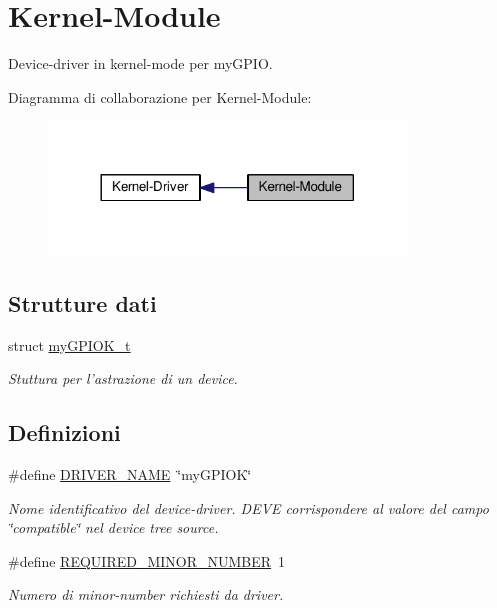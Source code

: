 \hypertarget{group___kernel-_module}{\section{Kernel-\/\+Module}
\label{group___kernel-_module}
}


Device-\/driver in kernel-\/mode per my\+G\+P\+I\+O.  


Diagramma di collaborazione per Kernel-\/\+Module\+:\nopagebreak
\begin{figure}[H]
\begin{center}
\leavevmode
\includegraphics[width=269pt]{group___kernel-_module}
\end{center}
\end{figure}
\subsection*{Strutture dati}
\begin{DoxyCompactItemize}
\item 
struct \hyperlink{structmy_g_p_i_o_k__t}{my\+G\+P\+I\+O\+K\+\_\+t}
\begin{DoxyCompactList}\small\item\em Stuttura per l'astrazione di un device. \end{DoxyCompactList}\end{DoxyCompactItemize}
\subsection*{Definizioni}
\begin{DoxyCompactItemize}
\item 
\#define \hyperlink{group___kernel-_module_ga25634d21648ca7fb7a2aca614bafaaeb}{D\+R\+I\+V\+E\+R\+\_\+\+N\+A\+M\+E}~\char`\"{}my\+G\+P\+I\+O\+K\char`\"{}
\begin{DoxyCompactList}\small\item\em Nome identificativo del device-\/driver. D\+E\+V\+E corrispondere al valore del campo \char`\"{}compatible\char`\"{} nel device tree source. \end{DoxyCompactList}\item 
\#define \hyperlink{group___kernel-_module_ga605a877d5e63c79a65d4a57d364680b4}{R\+E\+Q\+U\+I\+R\+E\+D\+\_\+\+M\+I\+N\+O\+R\+\_\+\+N\+U\+M\+B\+E\+R}~1
\begin{DoxyCompactList}\small\item\em Numero di minor-\/number richiesti da driver. \end{DoxyCompactList}\end{DoxyCompactItemize}
